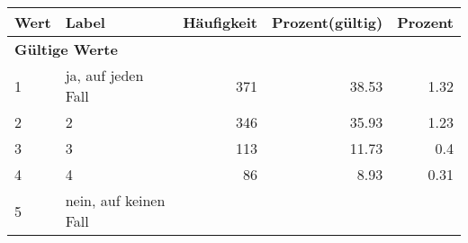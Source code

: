      \begin{longtable}{lXrrr}
     \toprule
     \textbf{Wert} & \textbf{Label} & \textbf{Häufigkeit} & \textbf{Prozent(gültig)} & \textbf{Prozent} \\
     \endhead
     \midrule
     \multicolumn{5}{l}{\textbf{Gültige Werte}}\\

     1 &
     \multicolumn{1}{X}{ ja, auf jeden Fall   } &


       \num{371} &
       \num[round-mode=places,round-precision=2]{38.53} &
         \num[round-mode=places,round-precision=2]{1.32} \\

     2 &
     \multicolumn{1}{X}{ 2   } &


       \num{346} &
       \num[round-mode=places,round-precision=2]{35.93} &
         \num[round-mode=places,round-precision=2]{1.23} \\

     3 &
     \multicolumn{1}{X}{ 3   } &


       \num{113} &
       \num[round-mode=places,round-precision=2]{11.73} &
         \num[round-mode=places,round-precision=2]{0.4} \\

     4 &
     \multicolumn{1}{X}{ 4   } &


       \num{86} &
       \num[round-mode=places,round-precision=2]{8.93} &
         \num[round-mode=places,round-precision=2]{0.31} \\

     5 &
     \multicolumn{1}{X}{ nein, auf keinen Fall   } &



\end{longtable}
